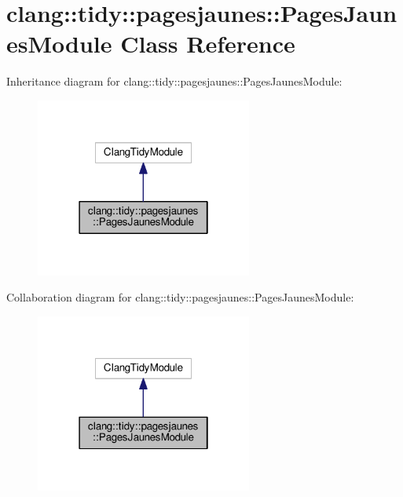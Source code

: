 \hypertarget{classclang_1_1tidy_1_1pagesjaunes_1_1_pages_jaunes_module}{}\section{clang\+:\+:tidy\+:\+:pagesjaunes\+:\+:Pages\+Jaunes\+Module Class Reference}
\label{classclang_1_1tidy_1_1pagesjaunes_1_1_pages_jaunes_module}


Inheritance diagram for clang\+:\+:tidy\+:\+:pagesjaunes\+:\+:Pages\+Jaunes\+Module\+:
\nopagebreak
\begin{figure}[H]
\begin{center}
\leavevmode
\includegraphics[width=202pt]{classclang_1_1tidy_1_1pagesjaunes_1_1_pages_jaunes_module__inherit__graph}
\end{center}
\end{figure}


Collaboration diagram for clang\+:\+:tidy\+:\+:pagesjaunes\+:\+:Pages\+Jaunes\+Module\+:
\nopagebreak
\begin{figure}[H]
\begin{center}
\leavevmode
\includegraphics[width=202pt]{classclang_1_1tidy_1_1pagesjaunes_1_1_pages_jaunes_module__coll__graph}
\end{center}
\end{figure}
